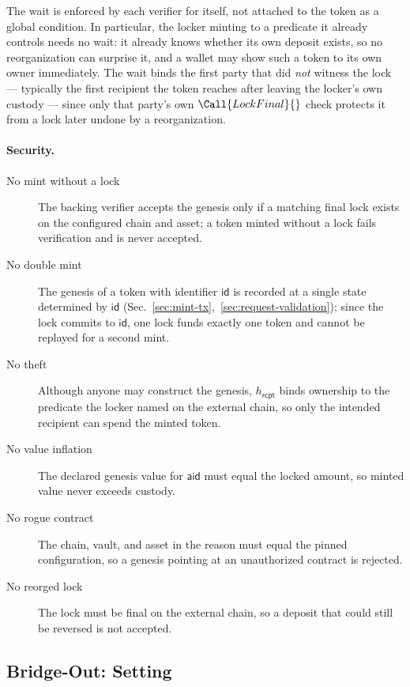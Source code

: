 The wait is enforced by each verifier for itself, not attached to the token as a global condition. In particular, the locker minting to a predicate it already controls needs no wait: it already knows whether its own deposit exists, so no reorganization can surprise it, and a wallet may show such a token to its own owner immediately. The wait binds the first party that did \emph{not} witness the lock --- typically the first recipient the token reaches after leaving the locker's own custody --- since only that party's own $\Call{LockFinal}{}$ check protects it from a lock later undone by a reorganization.

\paragraph{Security.}
\begin{description}
\item[No mint without a lock] The backing verifier accepts the genesis only if a matching final lock exists on the configured chain and asset; a token minted without a lock fails verification and is never accepted.
\item[No double mint] The genesis of a token with identifier $\mathsf{id}$ is recorded at a single state determined by $\mathsf{id}$ (Sec.~\ref{sec:mint-tx},~\ref{sec:request-validation}); since the lock commits to $\mathsf{id}$, one lock funds exactly one token and cannot be replayed for a second mint.
\item[No theft] Although anyone may construct the genesis, $h_\mathsf{rcpt}$ binds ownership to the predicate the locker named on the external chain, so only the intended recipient can spend the minted token.
\item[No value inflation] The declared genesis value for $\mathsf{aid}$ must equal the locked amount, so minted value never exceeds custody.
\item[No rogue contract] The chain, vault, and asset in the reason must equal the pinned configuration, so a genesis pointing at an unauthorized contract is rejected.
\item[No reorged lock] The lock must be final on the external chain, so a deposit that could still be reversed is not accepted.
\end{description}

\subsection{Bridge-Out: Setting}\label{sec:bridge-setting}

